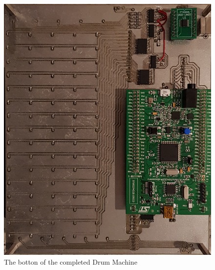 \documentclass[12pt,a4paper]{report}
\begin{document}
\begin{figure}[h!]
	\centering
	\includegraphics[height=0.5\textheight, angle=90]{back_UC.jpg}
	\caption{The botton of the completed Drum Machine}
\end{figure}
\end{document}
